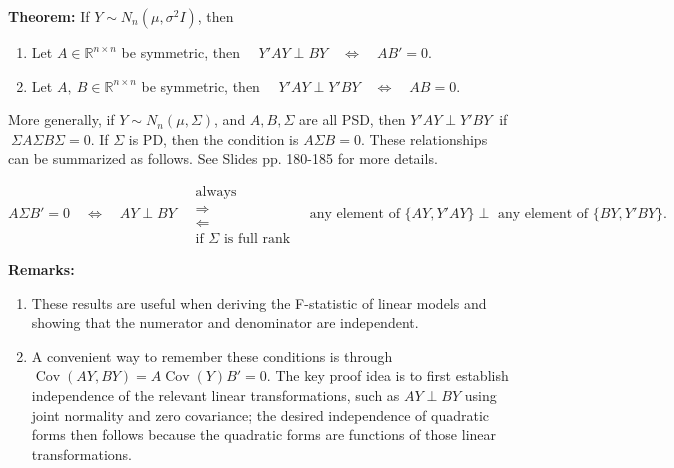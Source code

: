 \documentclass{article}
\newenvironment{mybox}{%
  \par\addvspace{10pt}%
  \begin{mdframed}[skipabove=0pt,skipbelow=10pt]%
}{%
  \end{mdframed}%
}
\theoremstyle{break}
\newcommand{\R}{\ensuremath{\mathbb{R}}}
\DeclareMathOperator{\Cov}{Cov}
\begin{document}
\textbf{Theorem:}
If $Y \sim N_n(\mu, \sigma^2 I)$, then
\begin{enumerate}
    \item Let $A\in\R^{n \times n}$ be symmetric, then $\quad Y'AY \perp BY \quad\Leftrightarrow\quad AB' = 0$.
    \item Let $A,\ B\in\R^{n \times n}$ be symmetric, then $\quad Y'AY \perp Y'BY \quad\Leftrightarrow\quad AB = 0$.
\end{enumerate}
More generally, if $Y \sim N_n(\mu, \Sigma)$, and $A, B, \Sigma$ are all PSD, then $Y'AY \perp Y'BY\ $ if $\ \Sigma A \Sigma B \Sigma = 0$. If $\Sigma$ is PD, then the condition is $A \Sigma B = 0$. 
These relationships can be summarized as follows. See Slides pp. 180-185 for more details.
\begin{mybox}
    \begin{equation}\label{eq:prelim-MVN-quad-indep}
    A\Sigma B'=0
    \quad\Longleftrightarrow\quad
    AY\perp BY
    \quad
    \mathrel{\begin{matrix}
        \text{always}\\[-0.2em]
        \Longrightarrow\\[-0.3em]
        \Longleftarrow\\[-0.2em]
        \text{if $\Sigma$ is full rank}
    \end{matrix}}
    \quad
    \text{any element of } \{AY,Y'AY\}
    \perp
    \text{ any element of } \{BY,Y'BY\}.
    \end{equation}
\end{mybox}

\textbf{Remarks:}
\begin{enumerate}
    \item These results are useful when deriving the F-statistic of linear models and showing that the numerator and denominator are independent.
    \item A convenient way to remember these conditions is through $\Cov(AY, BY) = A\Cov(Y)B' = 0$. 
    The key proof idea is to first establish independence of the relevant linear transformations, such as $AY \perp BY$ using joint normality and zero covariance; the desired independence of quadratic forms then follows because the quadratic forms are functions of those linear transformations.
\end{enumerate}
\end{document}
